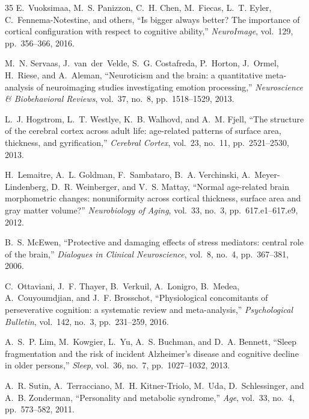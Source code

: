 \begin{thebibliography}{35}
E.~Vuoksimaa, M.~S. Panizzon, C.~H. Chen, M.~Fiecas, L.~T. Eyler, C.~Fennema-Notestine, and others,
``Is bigger always better? The importance of cortical configuration with respect to cognitive ability,''
\textit{NeuroImage}, vol.~129, pp.~356--366, 2016.

M.~N. Servaas, J.~van~der~Velde, S.~G. Costafreda, P.~Horton, J.~Ormel, H.~Riese, and A.~Aleman,
``Neuroticism and the brain: a quantitative meta-analysis of neuroimaging studies investigating emotion processing,''
\textit{Neuroscience \& Biobehavioral Reviews}, vol.~37, no.~8, pp.~1518--1529, 2013.

L.~J. Hogstrom, L.~T. Westlye, K.~B. Walhovd, and A.~M. Fjell,
``The structure of the cerebral cortex across adult life: age-related patterns of surface area, thickness, and gyrification,''
\textit{Cerebral Cortex}, vol.~23, no.~11, pp.~2521--2530, 2013.

H.~Lemaitre, A.~L. Goldman, F.~Sambataro, B.~A. Verchinski, A.~Meyer-Lindenberg, D.~R. Weinberger, and V.~S. Mattay,
``Normal age-related brain morphometric changes: nonuniformity across cortical thickness, surface area and gray matter volume?''
\textit{Neurobiology of Aging}, vol.~33, no.~3, pp.~617.e1--617.e9, 2012.

B.~S. McEwen,
``Protective and damaging effects of stress mediators: central role of the brain,''
\textit{Dialogues in Clinical Neuroscience}, vol.~8, no.~4, pp.~367--381, 2006.

C.~Ottaviani, J.~F. Thayer, B.~Verkuil, A.~Lonigro, B.~Medea, A.~Couyoumdjian, and J.~F. Brosschot,
``Physiological concomitants of perseverative cognition: a systematic review and meta-analysis,''
\textit{Psychological Bulletin}, vol.~142, no.~3, pp.~231--259, 2016.

A.~S.~P. Lim, M.~Kowgier, L.~Yu, A.~S. Buchman, and D.~A. Bennett,
``Sleep fragmentation and the risk of incident Alzheimer's disease and cognitive decline in older persons,''
\textit{Sleep}, vol.~36, no.~7, pp.~1027--1032, 2013.

A.~R. Sutin, A.~Terracciano, M.~H. Kitner-Triolo, M.~Uda, D.~Schlessinger, and A.~B. Zonderman,
``Personality and metabolic syndrome,''
\textit{Age}, vol.~33, no.~4, pp.~573--582, 2011.

\end{thebibliography}
